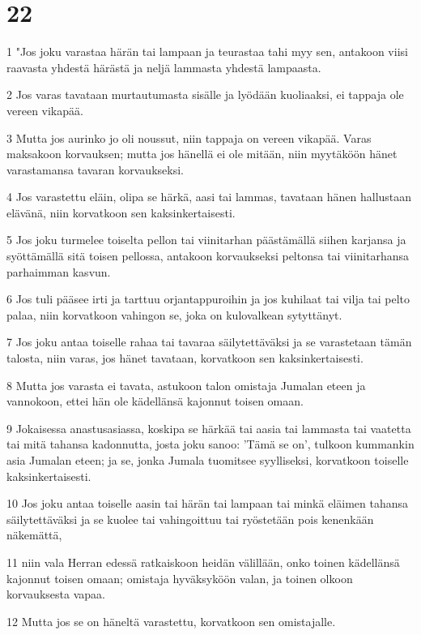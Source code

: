 \chapter{22}

\par 1 "Jos joku varastaa härän tai lampaan ja teurastaa tahi myy sen, antakoon viisi raavasta yhdestä härästä ja neljä lammasta yhdestä lampaasta.
\par 2 Jos varas tavataan murtautumasta sisälle ja lyödään kuoliaaksi, ei tappaja ole vereen vikapää.
\par 3 Mutta jos aurinko jo oli noussut, niin tappaja on vereen vikapää. Varas maksakoon korvauksen; mutta jos hänellä ei ole mitään, niin myytäköön hänet varastamansa tavaran korvaukseksi.
\par 4 Jos varastettu eläin, olipa se härkä, aasi tai lammas, tavataan hänen hallustaan elävänä, niin korvatkoon sen kaksinkertaisesti.
\par 5 Jos joku turmelee toiselta pellon tai viinitarhan päästämällä siihen karjansa ja syöttämällä sitä toisen pellossa, antakoon korvaukseksi peltonsa tai viinitarhansa parhaimman kasvun.
\par 6 Jos tuli pääsee irti ja tarttuu orjantappuroihin ja jos kuhilaat tai vilja tai pelto palaa, niin korvatkoon vahingon se, joka on kulovalkean sytyttänyt.
\par 7 Jos joku antaa toiselle rahaa tai tavaraa säilytettäväksi ja se varastetaan tämän talosta, niin varas, jos hänet tavataan, korvatkoon sen kaksinkertaisesti.
\par 8 Mutta jos varasta ei tavata, astukoon talon omistaja Jumalan eteen ja vannokoon, ettei hän ole kädellänsä kajonnut toisen omaan.
\par 9 Jokaisessa anastusasiassa, koskipa se härkää tai aasia tai lammasta tai vaatetta tai mitä tahansa kadonnutta, josta joku sanoo: 'Tämä se on', tulkoon kummankin asia Jumalan eteen; ja se, jonka Jumala tuomitsee syylliseksi, korvatkoon toiselle kaksinkertaisesti.
\par 10 Jos joku antaa toiselle aasin tai härän tai lampaan tai minkä eläimen tahansa säilytettäväksi ja se kuolee tai vahingoittuu tai ryöstetään pois kenenkään näkemättä,
\par 11 niin vala Herran edessä ratkaiskoon heidän välillään, onko toinen kädellänsä kajonnut toisen omaan; omistaja hyväksyköön valan, ja toinen olkoon korvauksesta vapaa.
\par 12 Mutta jos se on häneltä varastettu, korvatkoon sen omistajalle.
